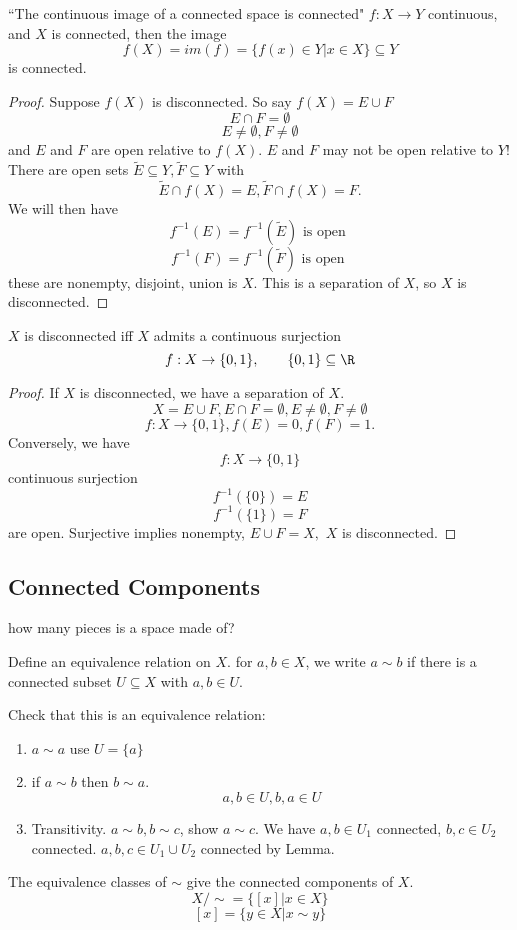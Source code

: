 \begin{proposition}
  ``The continuous image of a connected space is connected"
  \newline
  $f: X\to Y$ continuous, and $X$ is connected, then the image
    $$f(X)=im(f)=\{f(x)\in Y | x\in X\}\subseteq Y$$
  is connected.
\end{proposition}
\begin{proof}
  Suppose $f(X)$ is disconnected. So say $f(X)=E\cup F$
    $$E\cap F = \emptyset $$
    $$E \neq \emptyset, F \neq \emptyset$$
  and $E$ and $F$ are open relative to $f(X)$. $E$ and $F$ may not be open relative to $Y$!
  There are open sets $\tilde{E}\subseteq Y, \tilde{F}\subseteq Y$ with
    $$ \tilde{E} \cap f(X) = E, \tilde{F}\cap f(X)=F.$$
  We will then have
    $$f^{-1}(E)=f^{-1}(\tilde{E}) \text{ is open }$$
    $$f^{-1}(F)=f^{-1}(\tilde{F}) \text{ is open }$$
  these are nonempty, disjoint, union is $X$. This is a separation of $X$, so $X$ is disconnected.
  \qedhere
\end{proof}

\begin{lemma}
  $X$ is disconnected iff $X$ admits a continuous surjection
    $$f:X\to \{0,1\}, \qquad \{0,1\}\subseteq\R$$
\end{lemma}
\begin{proof}
  If $X$ is disconnected, we have a separation of $X$.
    $$X=E\cup F, E\cap F=\emptyset, E\neq \emptyset, F\neq \emptyset$$
  $$f:X\to \{0,1\}, f(E)=0, f(F)=1.$$
  \newline
  Conversely, we have
    $$f:X\to \{0,1\}$$
  continuous surjection
    $$f^{-1}(\{0\})=E$$
    $$f^{-1}(\{1\})=F$$
    are open. Surjective implies nonempty, $E\cup F=X,$ $X$ is disconnected.
\end{proof}

\subsection*{Connected Components}
how many pieces is a space made of?
\begin{definition}
  Define an equivalence relation on $X$.
  for $a,b\in X$, we write $a\sim b$ if there is a connected subset $U\subseteq X$ with $a,b\in U.$
\end{definition}
Check that this is an equivalence relation:
\begin{enumerate}[(1)]
  \item $a\sim a$ use $U=\{a\}$
  \item if $a\sim b$ then $b\sim a$.
    $$a,b\in U, b,a\in U$$
  \item Transitivity. $a\sim b, b\sim c$, show $a\sim c$. We have $a,b \in U_1$ connected, $b,c \in U_2$ connected. $a,b,c\in U_1 \cup U_2$ connected by Lemma.
\end{enumerate}
The equivalence classes of $\sim $ give the connected components of $X$.
$$X/\sim = \{[x]|x\in X\}$$
$$[x]=\{y\in X|x\sim y\}$$

